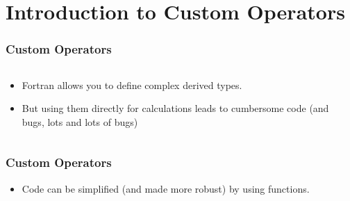 
\subtitle{Lecture 5: Custom Operators}



\begin{frame}
  \titlepage
\end{frame}

\section{Introduction to Custom Operators}


\begin{frame}[fragile]
  \frametitle{Custom Operators}
  \begin{columns}[T]
    \begin{column}{0.5\textwidth}
      \begin{itemize}
        \item Fortran allows you to define complex derived types.
        \item But using them directly for calculations leads to cumbersome code (and bugs, lots and lots of bugs)
      \end{itemize}
    \end{column}

    \begin{column}{0.5\textwidth}
    
    
    \end{column}
  \end{columns}
\end{frame}

\begin{frame}[fragile]
  \frametitle{Custom Operators}
        \begin{itemize}
        \item Code can be simplified (and made more robust) by using functions.
      \end{itemize}
  \begin{columns}[T]
    \begin{column}{0.5\textwidth}
          
    \end{column}

    \begin{column}{0.5\textwidth}
    
    \end{column}
  \end{columns}
\end{frame}

